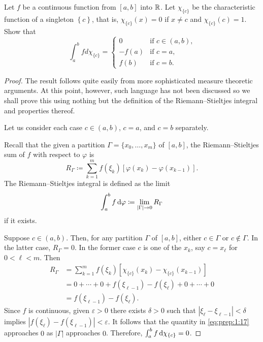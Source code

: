\begin{problem}
Let $f$ be a continuous function from $[a,b]$ into $\mathbb{R}$. Let
$\chi_{\{c\}}$ be the characteristic function of a singleton
$\left\{c\right\}$, that is, $\chi_{\{c\}}(x)=0$ if $x\neq c$ and
$\chi_{\{c\}}(c)=1$. Show that
\[
\int_a^b f d \chi_{\{c\}}=
\begin{cases}
0&\text{if $c\in(a,b)$,}\\
-f(a)&\text{if $c=a$,}\\
f(b)&\text{if $c=b$.}
\end{cases}
\]
\end{problem}
\begin{proof}
The result follows quite easily from more sophisticated measure theoretic
arguments. At this point, however, such language has not been discussed so
we shall prove this using nothing but the definition of the
Riemann--Stieltjes integral and properties thereof.

Let us consider each case $c\in(a,b)$, $c=a$, and $c=b$ separately.

Recall that the given a partition $\Gamma=\{x_0,\dotsc,x_m\}$ of $[a,b]$,
the Riemann--Stieltjes sum of $f$ with respect to $\varphi$ is
\begin{equation}
  \label{eq:prep:1:15}
R_\Gamma\coloneqq\sum_{k=1}^mf(\xi_k)[\varphi(x_k)-\varphi(x_{k-1})].
\end{equation}
The Riemann--Stieltjes integral is defined as the limit
\begin{equation}
\label{eq:prep:1:16}
\int_a^b f\mathop{}\!\mathrm{d}\varphi\coloneqq\lim_{|\Gamma|\to 0} R_\Gamma
\end{equation}
if it exists.

Suppose $c\in(a,b)$. Then, for any partition $\Gamma$ of $[a,b]$, either
$c\in\Gamma$ or $c\notin\Gamma$. In the latter case, $R_\Gamma=0$. In the
former case $c$ is one of the $x_k$, say $c=x_\ell$ for $0<\ell<m$. Then
\begin{equation}
\label{eq:prep:1:17}
\begin{aligned}
R_\Gamma&=\sum_{k=1}^mf(\xi_k)[\chi_{\{c\}}(x_k)-\chi_{\{c\}}(x_{k-1})]\\
&=0+\dotsb+0+f(\xi_{\ell-1})-f(\xi_\ell)+0+\dotsb+0\\
&=f(\xi_{\ell-1})-f(\xi_\ell).
\end{aligned}
\end{equation}
Since $f$ is continuous, given $\varepsilon>0$ there exists $\delta>0$ such
that $|\xi_\ell-\xi_{\ell-1}|<\delta$ implies
$|f(\xi_{\ell})-f(\xi_{\ell-1})|<\varepsilon$. It follows that the quantity
in \eqref{eq:prep:1:17} approaches $0$ as $|\Gamma|$ approaches
$0$. Therefore, $\int_a^b f\mathop{}\!\mathrm{d}\chi_{\{c\}}=0$.


\end{proof}

